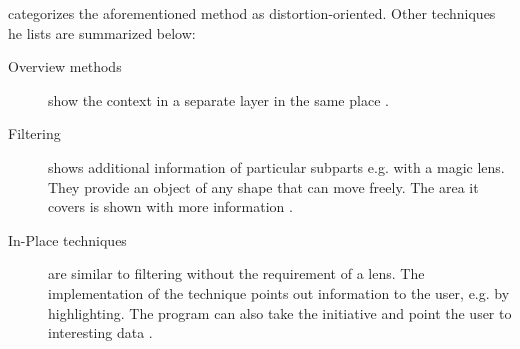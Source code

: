 \citeauthor{Kosara2003} categorizes the aforementioned method as distortion-oriented. Other techniques he lists are summarized below:
\begin{description}
\item[Overview methods] show the context in a separate layer in the same place .
\item[Filtering] shows additional information of particular subparts e.g. with a magic lens. They provide an object of any shape that can move freely. The area it covers is shown with more information .
\item[In-Place techniques] are similar to filtering without the requirement of a lens. The implementation of the technique points out information to the user, e.g. by highlighting. The program can also take the initiative and point the user to interesting data .
\end{description}
